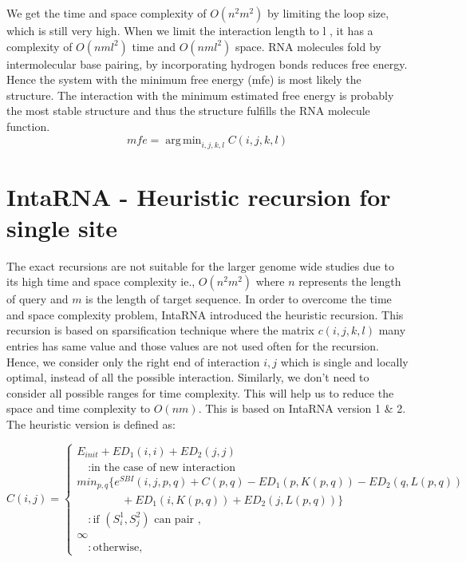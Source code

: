 \documentclass[twoside,a4paper]{report}
\DeclareMathOperator*{\argmin}{arg\,min}
\begin{document}
	We get the time and space complexity of $O(n^2m^2)$ by limiting the loop size, which is still very high. When we limit the interaction length to l , it has a complexity of $O(nml^2)$ time and $O(nml^2)$ space. RNA molecules fold by intermolecular base pairing, by incorporating hydrogen bonds reduces free energy. Hence the system with the minimum free energy (mfe) is most likely the structure. The interaction with the minimum estimated free energy is probably the most stable structure and thus the structure fulfills the RNA molecule function.\\
	
	 \begin{equation*}
	mfe = \argmin_{i,j,k,l} C(i,j,k,l)
	\end{equation*}

	
	
	\section{IntaRNA -  Heuristic recursion for single site}
	
	The exact recursions are not suitable for the larger genome wide studies due to its high time and space complexity ie., $O(n^2m^2)$	where $n$ represents the length of query and $m$ is the length of target sequence. In order to overcome the time and space complexity problem, IntaRNA introduced the heuristic recursion. This recursion is based on sparsification technique where the matrix $c(i,j,k,l)$ many entries has same value and those values are not used often for the recursion. Hence, we consider only the right end of interaction $i, j$  which is single and locally optimal, instead of all the possible interaction. Similarly, we don't need to consider all possible ranges for time complexity. This will help us to reduce the space and time complexity to $O(nm)$. This is based on IntaRNA version 1 \& 2. The heuristic version is defined as:
	
	\begin{equation}
	C(i,j) =  \begin{cases}
	E_{init} + ED_1(i, i) + ED_2(j, j) \\
	\quad 	: \text{in the case of new interaction}\\
	min_{p,q}\{ e^{SBI}(i,j,p,q)+ C(p,q) - ED_1(p,K(p,q)) - ED_2(q,L(p,q))\\
	\quad \quad \quad \quad + ED_1(i,K(p,q)) + ED_2(j,L(p,q))\} \\
	\quad 	: \text{if $(S_i^1 , S_j^2 )$ can pair },\\
	\infty \\
	\quad : \text{otherwise},
	\end{cases}
	\end{equation}
	
\end{document}
